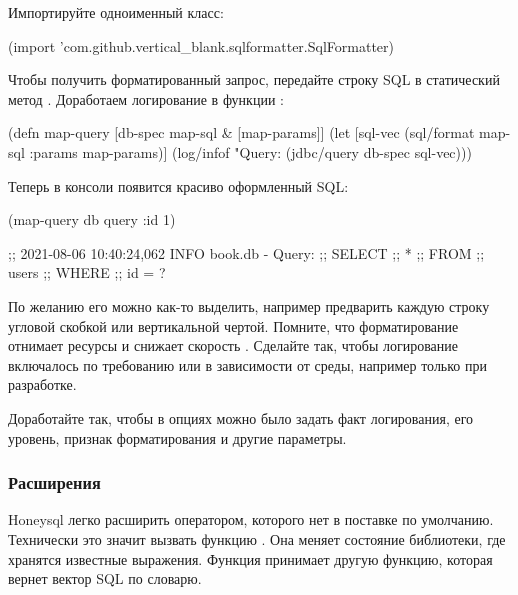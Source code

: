 Импортируйте одноименный класс:

\begin{english}
  \begin{clojure}
(import 'com.github.vertical_blank.sqlformatter.SqlFormatter)
  \end{clojure}
\end{english}

Чтобы получить форматированный запрос, передайте строку SQL в статический метод . Доработаем логирование в функции :

\begin{english}
  \begin{clojure}
(defn map-query [db-spec map-sql & [map-params]]
  (let [sql-vec (sql/format map-sql {:params map-params})]
    (log/infof "Query:\n%
    (jdbc/query db-spec sql-vec)))
  \end{clojure}
\end{english}

Теперь в консоли появится красиво оформленный SQL:

\begin{english}
  \begin{clojure}
(map-query db query {:id 1})

;; 2021-08-06 10:40:24,062 INFO  book.db - Query:
;; SELECT
;;  *
;; FROM
;;   users
;; WHERE
;;  id = ?
  \end{clojure}
\end{english}

По желанию его можно как-то выделить, например предварить каждую строку угловой скобкой или вертикальной чертой. Помните, что форматирование отнимает ресурсы и снижает скорость . Сделайте так, чтобы логирование включалось по требованию или в зависимости от среды, например только при разработке.

Доработайте  так, чтобы в опциях можно было задать факт логирования, его уровень, признак форматирования и другие параметры.

\subsubsection{Расширения}

Honeysql легко расширить оператором, которого нет в поставке по умолчанию. Технически это значит вызвать функцию . Она меняет состояние библиотеки, где хранятся известные выражения. Функция принимает другую функцию, которая вернет вектор SQL по словарю.

